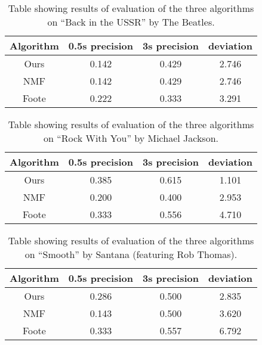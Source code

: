 \begin{table}
\begin{center}
\begin{tabular}{| c | c | c | c |} \hline 
Algorithm  &   0.5s precision   	&  3s precision 	&   deviation   	\\ \hline \hline
Ours			& 	0.142				&  0.429				& 	2.746		\\ \hline
NMF			&  0.142				&  0.429				&	2.746		\\ \hline
Foote		&  0.222				&  0.333				& 	3.291		\\ \hline
\end{tabular}
\caption{Table showing results of evaluation of the three algorithms on ``Back in the USSR'' by The Beatles.}
\label{table:evalUSSR}
\end{center}
\end{table}

\begin{table}
\begin{center}
\begin{tabular}{| c | c | c | c |} \hline 
Algorithm  &   0.5s precision   	&  3s precision 	&   deviation   	\\ \hline \hline
Ours			& 	0.385				&  0.615				& 	1.101		\\ \hline
NMF			&  0.200				&  0.400				&	2.953		\\ \hline
Foote		&  0.333				&  0.556				& 	4.710		\\ \hline
\end{tabular}
\caption{Table showing results of evaluation of the three algorithms on ``Rock With You'' by Michael Jackson.}
\label{table:evalRockwithyou}
\end{center}
\end{table}


\begin{table}
\begin{center}
\begin{tabular}{| c | c | c | c |} \hline 
Algorithm  &   0.5s precision   	&  3s precision 	&   deviation   	\\ \hline \hline
Ours			& 	0.286				&  0.500				& 	2.835		\\ \hline
NMF			&  0.143				&  0.500				&	3.620		\\ \hline
Foote		&  0.333				&  0.557				& 	6.792		\\ \hline
\end{tabular}
\caption{Table showing results of evaluation of the three algorithms on ``Smooth'' by Santana (featuring Rob Thomas).}
\label{table:evalSmooth}
\end{center}
\end{table}

